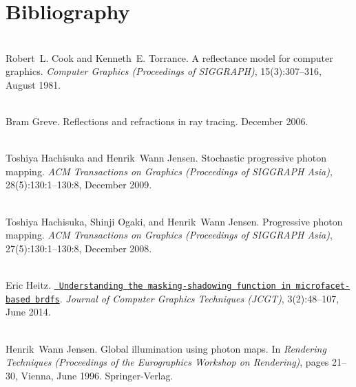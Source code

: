 \chapter{Bibliography}
\hypertarget{citelist}{}\label{citelist}

\begin{DoxyDescription}
\item[\label{citelist_CITEREF_Cook:1981:Reflectance}%
\Hypertarget{citelist_CITEREF_Cook:1981:Reflectance}%
\mbox{[}1\mbox{]}]\hfill \\
Robert~L. Cook and Kenneth~E. Torrance. A reflectance model for computer graphics. {\itshape Computer Graphics (Proceedings of SIGGRAPH)}, 15(3)\+:307--316, August 1981. 


\item[\label{citelist_CITEREF_Greve:2006:Reflections}%
\Hypertarget{citelist_CITEREF_Greve:2006:Reflections}%
\mbox{[}2\mbox{]}]\hfill \\
Bram Greve. Reflections and refractions in ray tracing. December 2006.


\item[\label{citelist_CITEREF_Hachisuka:2009:Stochastic}%
\Hypertarget{citelist_CITEREF_Hachisuka:2009:Stochastic}%
\mbox{[}3\mbox{]}]\hfill \\
Toshiya Hachisuka and Henrik~Wann Jensen. Stochastic progressive photon mapping. {\itshape ACM Transactions on Graphics (Proceedings of SIGGRAPH Asia)}, 28(5)\+:130\+:1--130\+:8, December 2009. 


\item[\label{citelist_CITEREF_Hachisuka:2008:Progressive}%
\Hypertarget{citelist_CITEREF_Hachisuka:2008:Progressive}%
\mbox{[}4\mbox{]}]\hfill \\
Toshiya Hachisuka, Shinji Ogaki, and Henrik~Wann Jensen. Progressive photon mapping. {\itshape ACM Transactions on Graphics (Proceedings of SIGGRAPH Asia)}, 27(5)\+:130\+:1--130\+:8, December 2008. 


\item[\label{citelist_CITEREF_Heitz:2014:Microfacet}%
\Hypertarget{citelist_CITEREF_Heitz:2014:Microfacet}%
\mbox{[}5\mbox{]}]\hfill \\
Eric Heitz. \href{http://jcgt.org/published/0003/02/03/}{\texttt{ Understanding the masking-\/shadowing function in microfacet-\/based brdfs}}. {\itshape Journal of Computer Graphics Techniques (JCGT)}, 3(2)\+:48--107, June 2014.


\item[\label{citelist_CITEREF_Jensen:1996:Global}%
\Hypertarget{citelist_CITEREF_Jensen:1996:Global}%
\mbox{[}6\mbox{]}]\hfill \\
Henrik~Wann Jensen. Global illumination using photon maps. In {\itshape Rendering Techniques (Proceedings of the Eurographics Workshop on Rendering)}, pages 21--30, Vienna, June 1996. Springer-\/\+Verlag. 



\end{DoxyDescription}
